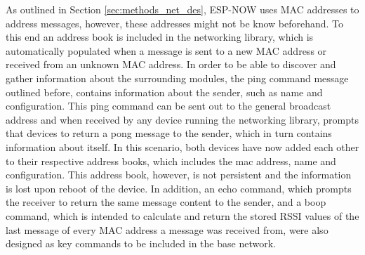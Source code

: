 As outlined in Section \ref{sec:methods_net_des}, ESP-NOW uses MAC addresses to address messages, however, these addresses might not be know beforehand. To this end an address book is included in the networking library, which is automatically populated when a message is sent to a new MAC address or received from an unknown MAC address. In order to be able to discover and gather information about the surrounding modules, the ping command message outlined before, contains information about the sender, such as name and configuration. This ping command can be sent out to the general broadcast address and when received by any device running the networking library, prompts that devices to return a pong message to the sender, which in turn contains information about itself. In this scenario, both devices have now added each other to their respective address books, which includes the mac address, name and configuration. This address book, however, is not persistent and the information is lost upon reboot of the device. In addition, an echo command, which prompts the receiver to return the same message content to the sender, and a boop command, which is intended to calculate and return the stored RSSI values of the last message of every MAC address a message was received from, were also designed as key commands to be included in the base network.\\

